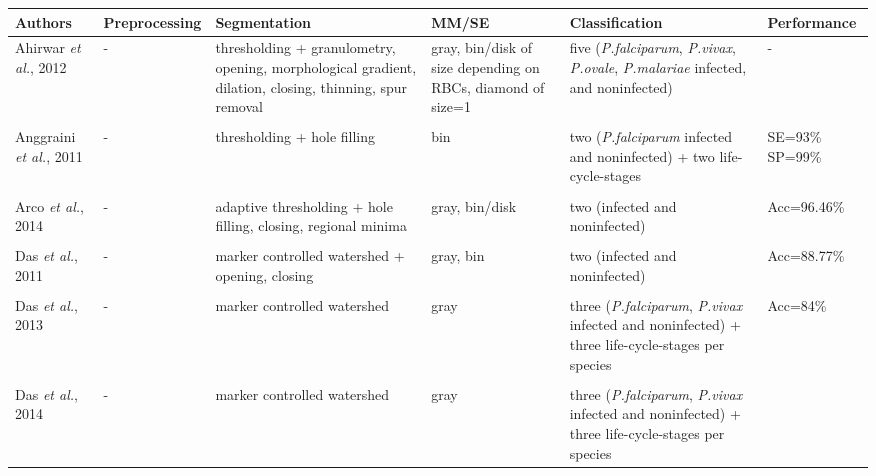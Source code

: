 \footnotesize
{}
    \begin{longtable}{C{2.1cm} C{2.7cm} C{2.2cm} C{2.0cm} C{2.7cm} C{2.0cm} }

		\hline
    	\textbf{Authors} & \textbf{Preprocessing} & \textbf{Segmentation} & \textbf{MM/SE} & \textbf{Classification} & \textbf{Performance}  \\[1pt] \hline

    Ahirwar \emph{et al.}, 2012  &
    	- &
    	thresholding + granulometry, opening, morphological gradient, dilation, closing, thinning, spur removal &
    	gray, bin/disk of size depending on RBCs, diamond of size=1 &
    	five (\emph{P.falciparum}, \emph{P.vivax}, \emph{P.ovale}, \emph{P.malariae} infected, and noninfected) &
    	-  \\
&   &  &  &  & \\
    Anggraini \emph{et al.}, 2011 &
		- &
		thresholding + hole filling &	
		bin &
		two (\emph{P.falciparum} infected and noninfected) + two life-cycle-stages &
		SE=93\% SP=99\%
		\\
&   &  &  &  & \\
    Arco \emph{et al.}, 2014 &
		- &
		adaptive thresholding + hole filling, closing, regional minima &	
		gray, bin/disk &
		two (infected and noninfected) &
		Acc=96.46\%
        \\
        &   &  &  &  & \\
    Das \emph{et al.}, 2011 &
		- &
		marker controlled watershed + opening, closing &	
		gray, bin  &
		two (infected and noninfected) &
		Acc=88.77\%
        \\
        &   &  &  &  & \\
    Das \emph{et al.}, 2013 &
		- &
		marker controlled watershed &	
		gray &
	three (\emph{P.falciparum}, \emph{P.vivax} infected and noninfected) + three life-cycle-stages per species &
		Acc=84\%
        \\
&   &  &  &  & \\
    Das \emph{et al.}, 2014 &
		- &
		marker controlled watershed &	
		gray &
	three (\emph{P.falciparum}, \emph{P.vivax} infected and noninfected) + three life-cycle-stages per species &

\end{longtable}
